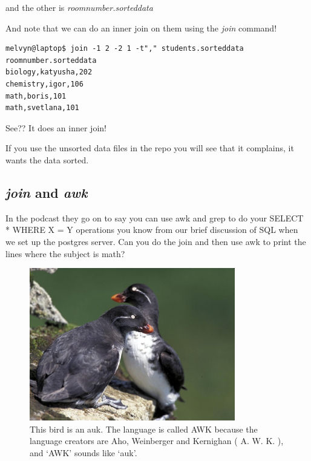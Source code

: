 \documentclass[10pt]{article}
\begin{document}
and the other is \textit{roomnumber.sorteddata}



And note that we can do an inner join on them using the \textit{join} command!

\begin{lstlisting}
melvyn@laptop$ join -1 2 -2 1 -t"," students.sorteddata roomnumber.sorteddata
biology,katyusha,202
chemistry,igor,106
math,boris,101
math,svetlana,101
\end{lstlisting}

See?? It does an inner join!

If you use the unsorted data files in the repo you will see that it complains,
it wants the data sorted.

\subsection{\textit{join} and \textit{awk}}
In the podcast they go on to say you can use awk and grep to do your SELECT *
WHERE X = Y operations you know from our brief discussion of SQL when we set up
the postgres server. Can you do the join and then use awk to print the lines
where the subject is math?

\begin{figure}[h]
  \centering
    \includegraphics[width=0.8\textwidth]{auk.jpg}
  \caption{This bird is an auk. The language is called AWK because the language creators are Aho,
Weinberger and Kernighan ( A. W. K. ), and `AWK' sounds like `auk'.}
\end{figure}
\end{document}
